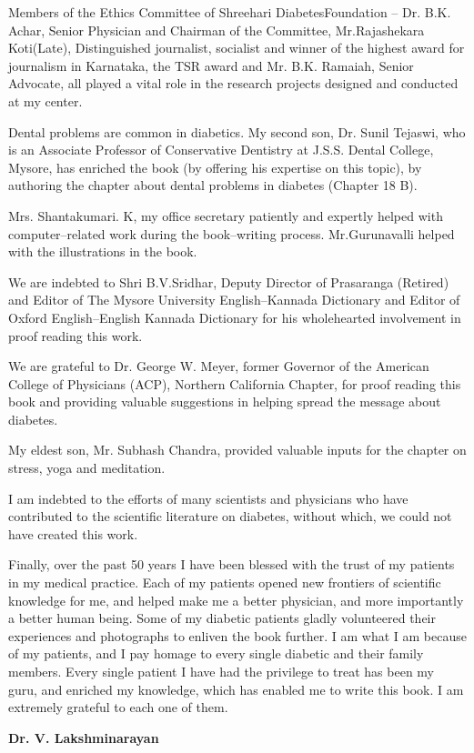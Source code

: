 Members of the Ethics Committee of Shreehari Diabetes\break Foundation – Dr. B.K. Achar, Senior Physician and Chairman of the Committee, Mr.Rajashekara Koti(Late), Distinguished journa\-list, socia\-list and winner of the highest award for journalism in Karnataka, the TSR award and Mr. B.K. Ramaiah, Senior Advocate, all played a vital role in the research projects designed and conducted at my center.

Dental problems are common in diabetics. My second son, Dr. Sunil Tejaswi, who is an Associate Professor of Conservative Dentistry at J.S.S. Dental College, Mysore, has enriched the book (by offering his expertise on this topic), by authoring the chapter about dental problems in diabetes (Chapter 18 B).

Mrs. Shantakumari. K, my office secretary patiently and expertly helped with computer–related work during the book–writing process. Mr.Gurunavalli helped with the illustrations in the book.

We are indebted to Shri B.V.Sridhar, Deputy Director of Prasaranga (Retired) and Editor of The Mysore University English–Kannada Dictionary and Editor of Oxford English–English Kannada Dictionary for his wholehearted involvement in proof reading this work.

We are grateful to Dr. George W. Meyer, former Governor of the American College of Physicians (ACP), Northern California Chapter, for proof reading this book and providing valuable suggestions in helping spread the message about diabetes.

My eldest son, Mr. Subhash Chandra, provided valuable inputs for the chapter on stress, yoga and meditation.

I am indebted to the efforts of many scientists and physicians who have contributed to the scientific literature on diabetes, without which, we could not have created this work.

Finally, over the past 50 years I have been blessed with the trust of my patients in my medical practice. Each of my patients opened new frontiers of scientific knowledge for me, and helped make me a better physician, and more importantly a better human being. Some of my dia\-betic patients gladly volunteered their experiences and photographs to enliven the book further. I am what I am because of my patients, and I pay homage to every single diabetic and their family members. Every single patient I have had the privilege to treat has been my guru, and enriched my knowledge, which has enabled me to write this book. I am extremely grateful to each one of them.

\begin{flushright}
\textbf{Dr. V. Lakshminarayan}
\end{flushright}

